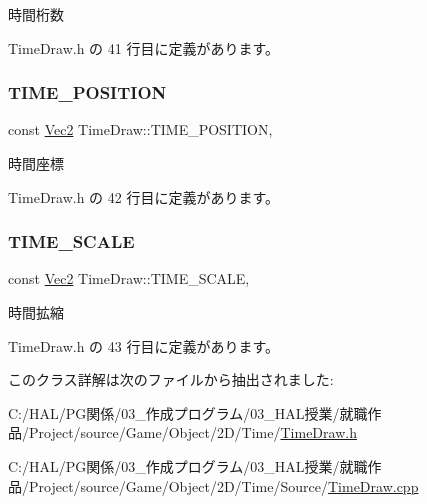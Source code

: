 時間桁数 



 Time\+Draw.\+h の 41 行目に定義があります。

\mbox{\label{class_time_draw_a72df1ddbe9ea6a326e2a4f2a950b0fe1}} 
\subsubsection{\texorpdfstring{T\+I\+M\+E\+\_\+\+P\+O\+S\+I\+T\+I\+ON}{TIME\_POSITION}}
{\footnotesize\ttfamily const \mbox{\hyperlink{_vector3_d_8h_a5ef6e95dfc5f9d3820b71772d99bbc25}{Vec2}} Time\+Draw\+::\+T\+I\+M\+E\+\_\+\+P\+O\+S\+I\+T\+I\+ON\hspace{0.3cm}{\ttfamily [static]}, {\ttfamily [private]}}



時間座標 



 Time\+Draw.\+h の 42 行目に定義があります。

\mbox{\label{class_time_draw_a2cc7a69141e165fb397b5e06caf7828e}} 
\subsubsection{\texorpdfstring{T\+I\+M\+E\+\_\+\+S\+C\+A\+LE}{TIME\_SCALE}}
{\footnotesize\ttfamily const \mbox{\hyperlink{_vector3_d_8h_a5ef6e95dfc5f9d3820b71772d99bbc25}{Vec2}} Time\+Draw\+::\+T\+I\+M\+E\+\_\+\+S\+C\+A\+LE\hspace{0.3cm}{\ttfamily [static]}, {\ttfamily [private]}}



時間拡縮 



 Time\+Draw.\+h の 43 行目に定義があります。



このクラス詳解は次のファイルから抽出されました\+:\begin{DoxyCompactItemize}
\item 
C\+:/\+H\+A\+L/\+P\+G関係/03\+\_\+作成プログラム/03\+\_\+\+H\+A\+L授業/就職作品/\+Project/source/\+Game/\+Object/2\+D/\+Time/\mbox{\hyperlink{_time_draw_8h}{Time\+Draw.\+h}}\item 
C\+:/\+H\+A\+L/\+P\+G関係/03\+\_\+作成プログラム/03\+\_\+\+H\+A\+L授業/就職作品/\+Project/source/\+Game/\+Object/2\+D/\+Time/\+Source/\mbox{\hyperlink{_time_draw_8cpp}{Time\+Draw.\+cpp}}\end{DoxyCompactItemize}
